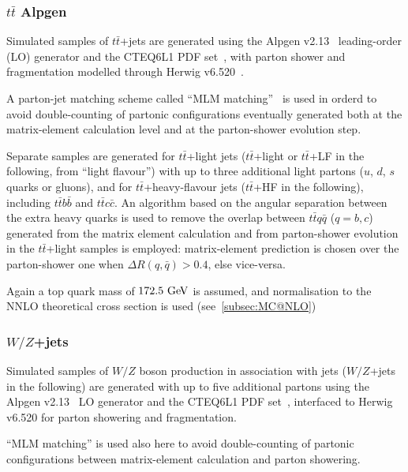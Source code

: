 \subsubsection{$t\bar{t}$ Alpgen}\label{subsec:alpgen}
Simulated samples of $t\bar{t}$+jets are generated using
 the {\sc Alpgen v2.13}~\cite{alpgen} leading-order (LO) generator and the 
{\sc CTEQ6L1} PDF set~\cite{cteq6}, with parton shower and fragmentation  
modelled through {\sc Herwig} v6.520~\cite{herwig}.

A parton-jet matching scheme called ``MLM matching''~\cite{mlm} is used
in orderd to avoid double-counting  of partonic configurations
eventually generated both at the matrix-element calculation level
and at the parton-shower evolution step.

Separate samples are generated for $t\bar{t}$+light jets ($t\bar{t}$+light 
or $t\bar{t}$+LF in the following, from ``light flavour'') 
with up to three additional light partons ($u$, $d$, $s$ quarks or gluons),
and for $t\bar{t}$+heavy-flavour jets ($t\bar{t}$+HF in the following), 
including $t\bar{t}b\bar{b}$ and
$t\bar{t}c\bar{c}$.  
An algorithm based on the angular separation
between the extra heavy quarks is used to remove 
the overlap between $t\bar{t}q\bar{q}$ ($q=b,c$) 
generated from the matrix element calculation and 
from parton-shower evolution in the  $t\bar{t}$+light samples
is employed: matrix-element prediction is chosen over the parton-shower one
when $\Delta R(q,\bar{q})>0.4$, else vice-versa.


Again a top quark mass of $172.5\gev$ is assumed, and normalisation to the
NNLO theoretical cross section is used (see~\ref{subsec:MC@NLO})

\subsubsection{$W/Z$+jets}

Simulated samples of $W/Z$ boson production in association with jets
($W/Z$+jets in the following) are generated with up to five additional 
partons using the {\sc Alpgen v2.13}~\cite{alpgen} LO generator and the 
{\sc CTEQ6L1} PDF set~\cite{cteq6}, interfaced to {\sc Herwig} v6.520 
for parton showering and fragmentation.

``MLM matching'' is used also here to avoid double-counting of partonic configurations 
between  matrix-element  calculation and parton showering.

